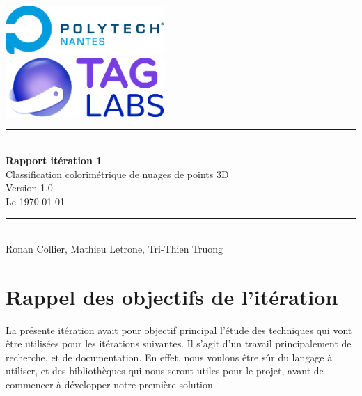 \documentclass[12pt,titlepage,french]{article}
\begin{document}

\begin{titlepage}
\newcommand{\HRule}{\rule{\linewidth}{0.5mm}}
\center

  \includegraphics[width=0.45\textwidth]{../../ressources/img_logos/logo_polytech.png}\\[1cm]

  \includegraphics[width=0.45\textwidth]{../../ressources/img_logos/logo_taglabs.png}


\HRule \\[0.4cm]
{ \huge \bfseries Rapport itération 1\\[0.15cm] }
Classification colorimétrique de nuages de points 3D\\
Version 1.0\\
Le \today \\
\HRule \\[1.5cm]
Ronan Collier,
Mathieu Letrone,
Tri-Thien Truong
\\[1cm]
\end{titlepage}

\tableofcontents %
\newpage

\section{Rappel des objectifs de l'itération}
La présente itération avait pour objectif principal l'étude des techniques qui vont être utilisées pour les itérations suivantes.
Il s'agit d'un travail principalement de recherche, et de documentation. En effet, nous voulons être sûr du langage à utiliser, et des bibliothèques qui nous seront utiles pour le projet, avant de commencer à développer notre première solution.
\end{document}
